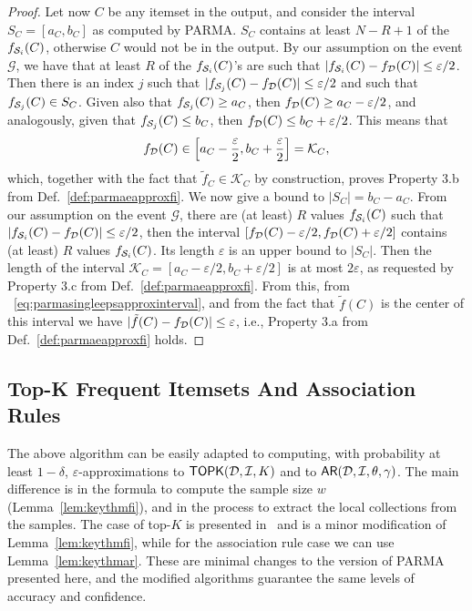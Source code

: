 \begin{proof}
  Let now $C$ be any itemset in the output, and consider the interval
  $S_C=[a_C,b_C]$ as computed by PARMA. $S_C$ contains at least $N-R+1$ of
  the $f_{{\cal S}_i}(C)$, otherwise $C$ would not be in the output. By our
  assumption on the event $\mathcal{G}$, we have
  that at least $R$ of the $f_{{\cal S}_i}(C)$'s are such that
  $|f_{{\cal S}_i}(C)-f_{\cal D}(C)|\le\varepsilon/2$. Then there is an index $j$ such
  that $|f_{{\cal S}_j}(C)-f_{\cal D}(C)|\le\varepsilon/2$ and such that
  $f_{{\cal S}_j}(C)\in S_C$.
  Given also that $f_{{\cal S}_j}(C)\ge a_C$, then $f_{\cal D}(C)\ge
  a_C-\varepsilon/2$, and analogously, given that $f_{{\cal S}_j}(C)\le b_C$, then
  $f_{\cal D}(C)\le b_C+\varepsilon/2$. This means that
  \begin{equation}\label{eq:parmasingleepsapproxinterval}
    f_{\cal D}(C)\in
    \left[a_C-\frac{\varepsilon}{2},
    b_C+\frac{\varepsilon}{2}\right]=\mathcal{K}_C,
  \end{equation}
  which, together with the fact that $\tilde{f}_C\in\mathcal{K}_C$ by
  construction, proves Property 3.b from Def.~\ref{def:parmaeapproxfi}.
  We now give a bound to $|S_C|=b_C-a_C$. From our
  assumption on the event $\mathcal{G}$, there are (at least) $R$ values
  $f_{{\cal S}_i}(C)$ such that $|f_{{\cal S}_i}(C)-f_{\cal D}(C)|\le\varepsilon/2$, then the
  interval $[f_{\cal D}(C)-\varepsilon/2,f_{\cal D}(C)+\varepsilon/2]$ contains (at least)
  $R$ values $f_{{\cal S}_i}(C)$. Its length $\varepsilon$ is an upper bound to
  $|S_C|$. Then the length of the interval
  $\mathcal{K}_C=[a_C-\varepsilon/2,b_C+\varepsilon/2]$ is at most
  $2\varepsilon$, as requested by Property 3.c from
  Def.~\ref{def:parmaeapproxfi}. From this, from ~\eqref{eq:parmasingleepsapproxinterval}, and
  from the fact that $\tilde{f}(C)$ is the center of this interval we have
  $|\tilde{f}(C)-f_{\cal D}(C)|\le\varepsilon$, i.e., Property 3.a from
  Def.~\ref{def:parmaeapproxfi} holds.
\end{proof}

\subsection{Top-K Frequent Itemsets And Association Rules}\label{sec:parmaeapproxtopk}
The above algorithm can be easily adapted to computing, with probability at
least $1-\delta$, $\varepsilon$-approximations to $\mathsf{TOPK}({\cal D},{\cal I},K)$ and to
$\mathsf{AR}({\cal D},{\cal I},\theta,\gamma)$. The main difference is in the formula to compute
the sample size $w$ (Lemma~\ref{lem:keythmfi}), and in the process
to extract the local collections from the samples. The case of top-$K$ is
presented in~\cite{RiondatoU12} and is a minor modification of
Lemma~\ref{lem:keythmfi}, while for the association rule case we can use
Lemma~\ref{lem:keythmar}. These are minimal changes to the version of
PARMA presented here, and the modified algorithms guarantee the same levels of
accuracy and confidence.

